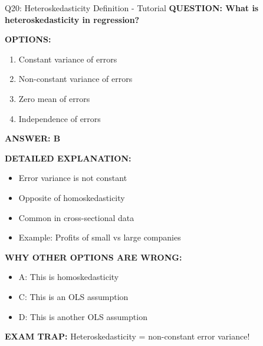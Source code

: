 \documentclass[8pt]{beamer}
\begin{document}
	\begin{frame}{Q20: Heteroskedasticity Definition - Tutorial}
		\fontsize{6.5}{7.5}\selectfont
		\textbf{QUESTION: What is heteroskedasticity in regression?}
		
		\vspace{0.1cm}
		\textbf{OPTIONS:}
		\begin{enumerate}
			\item Constant variance of errors
			\item Non-constant variance of errors
			\item Zero mean of errors
			\item Independence of errors
		\end{enumerate}
		
		\vspace{0.1cm}
		\textcolor{myblue}{\textbf{ANSWER: B}}
		
		\vspace{0.1cm}
		\textbf{DETAILED EXPLANATION:}
		\begin{itemize}
			\item Error variance is not constant
			\item Opposite of homoskedasticity
			\item Common in cross-sectional data
			\item Example: Profits of small vs large companies
		\end{itemize}
		
		\vspace{0.1cm}
		\textcolor{myred}{\textbf{WHY OTHER OPTIONS ARE WRONG:}}
		\begin{itemize}
			\item \textcolor{myred}{A:} This is homoskedasticity
			\item \textcolor{myred}{C:} This is an OLS assumption
			\item \textcolor{myred}{D:} This is another OLS assumption
		\end{itemize}
		
		\textcolor{myred}{\textbf{EXAM TRAP:}} Heteroskedasticity = \textcolor{myblue}{non-constant error variance}!
	\end{frame}
	
\end{document}
